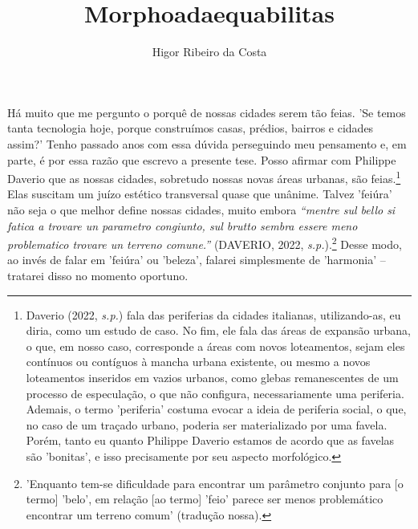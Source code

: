 \documentclass[]{report}
\title{Morphoadaequabilitas}
\author{Higor Ribeiro da Costa}
\begin{document}
\maketitle

\begin{abstract}
\end{abstract}

Há muito que me pergunto o porquê de nossas cidades serem tão feias. 'Se temos tanta tecnologia hoje, porque construímos casas, prédios, bairros e cidades assim?' Tenho passado anos com essa dúvida perseguindo meu pensamento e, em parte, é por essa razão que escrevo a presente tese. Posso afirmar com Philippe Daverio que as nossas cidades, sobretudo nossas novas áreas urbanas, são feias.\footnote[1]{Daverio (2022, \textit{s.p.}) fala das periferias da cidades italianas, utilizando-as, eu diria, como um estudo de caso. No fim, ele fala das áreas de expansão urbana, o que, em nosso caso, corresponde a áreas com novos loteamentos, sejam eles contínuos ou contíguos à mancha urbana existente, ou mesmo a novos loteamentos inseridos em vazios urbanos, como glebas remanescentes de um processo de especulação, o que não configura, necessariamente uma periferia. Ademais, o termo 'periferia' costuma evocar a ideia de periferia social, o que, no caso de um traçado urbano, poderia ser materializado por uma favela. Porém, tanto eu quanto Philippe Daverio estamos de acordo que as favelas são 'bonitas', e isso precisamente por seu aspecto morfológico.} Elas suscitam um juízo estético transversal quase que unânime. Talvez 'feiúra' não seja o que melhor define nossas cidades, muito embora \textit{“mentre sul bello si fatica a trovare un parametro congiunto, sul brutto sembra essere meno problematico trovare un terreno comune.”} (DAVERIO, 2022, \textit{s.p.}).\footnote[2]{'Enquanto tem-se dificuldade para encontrar um parâmetro conjunto para [o termo] 'belo', em relação [ao termo] 'feio' parece ser menos problemático encontrar um terreno comum' (tradução nossa).} Desse modo, ao invés de falar em 'feiúra' ou 'beleza', falarei simplesmente de 'harmonia' – tratarei disso no momento oportuno.
\end{document}
